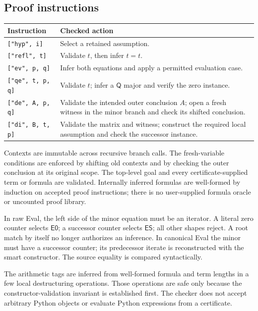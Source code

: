 \documentclass[11pt]{article}
\theoremstyle{definition}\newtheorem{definition}[theorem]{Definition}
\newcommand{\Q}{\mathsf Q}
\newcommand{\evz}{\mathsf{E0}}
\newcommand{\evs}{\mathsf{ES}}
\begin{document}
\subsection{Proof instructions}

\begin{center}
\begin{tabular}{@{}p{.37\linewidth}p{.56\linewidth}@{}}
\toprule
Instruction & Checked action\\
\midrule
\texttt{["hyp", i]} & Select a retained assumption.\\
\texttt{["refl", t]} & Validate $t$, then infer $t=t$.\\
\texttt{["ev", p, q]} & Infer both equations and apply a permitted evaluation case.\\
\texttt{["qe", t, p, q]} & Validate $t$; infer a $\Q$ major and verify the zero instance.\\
\texttt{["de", A, p, q]} & Validate the intended outer conclusion $A$; open a fresh witness in the minor branch and check its shifted conclusion.\\
\texttt{["di", B, t, p]} & Validate the matrix and witness; construct the required local assumption and check the successor instance.\\
\bottomrule
\end{tabular}
\end{center}
Contexts are immutable across recursive branch calls. The fresh-variable
conditions are enforced by shifting old contexts and by checking the
outer conclusion at its original scope. The top-level goal and every
certificate-supplied term or formula are validated. Internally inferred
formulas are well-formed by induction on accepted proof instructions;
there is no user-supplied formula oracle or uncounted proof library.

In raw Eval, the left side of the minor equation must be an iterator.
A literal zero counter selects $\evz$; a successor counter selects
$\evs$; all other shapes reject. A root match by itself no longer
authorizes an inference. In canonical Eval the minor must have a
successor counter; its predecessor iterate is reconstructed with the
smart constructor. The source equality is compared syntactically.

The arithmetic tags are inferred from well-formed formula and term
lengths in a few local destructuring operations. Those operations are
safe only because the constructor-validation invariant is established
first. The checker does not accept arbitrary Python objects or evaluate
Python expressions from a certificate.
\end{document}
